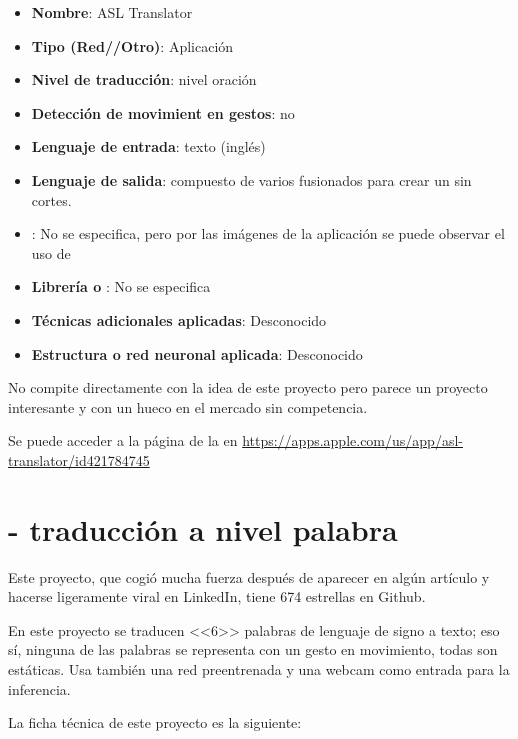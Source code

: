 \begin{itemize}
  \item \textbf{Nombre}: ASL Translator
  \item \textbf{Tipo (Red//Otro)}: Aplicación
  \item \textbf{Nivel de traducción}: nivel oración
  \item \textbf{Detección de movimient en gestos}: no
  \item \textbf{Lenguaje de entrada}: texto (inglés)
  \item \textbf{Lenguaje de salida}:  compuesto de varios  fusionados para crear un  sin cortes.
  \item \textbf{}: No se especifica, pero por las imágenes de la aplicación se puede observar el uso de 
  \item \textbf{Librería o }: No se especifica
  \item \textbf{Técnicas adicionales aplicadas}: Desconocido
  \item \textbf{Estructura o red neuronal aplicada}: Desconocido
\end{itemize}

No compite directamente con la idea de este proyecto pero parece un proyecto interesante y con un hueco en el mercado sin competencia.

Se puede acceder a la página de la  en \url{https://apps.apple.com/us/app/asl-translator/id421784745}

\section{ - traducción a nivel palabra}

Este proyecto, que cogió mucha fuerza después de aparecer en algún artículo y hacerse ligeramente viral en LinkedIn, tiene 674 estrellas en Github.

En este proyecto se traducen <<6>> palabras de lenguaje de signo a texto; eso sí, ninguna de las palabras se representa con un gesto en movimiento, todas son estáticas. Usa también una red preentrenada y una webcam como entrada para la inferencia.

La ficha técnica de este proyecto es la siguiente:

